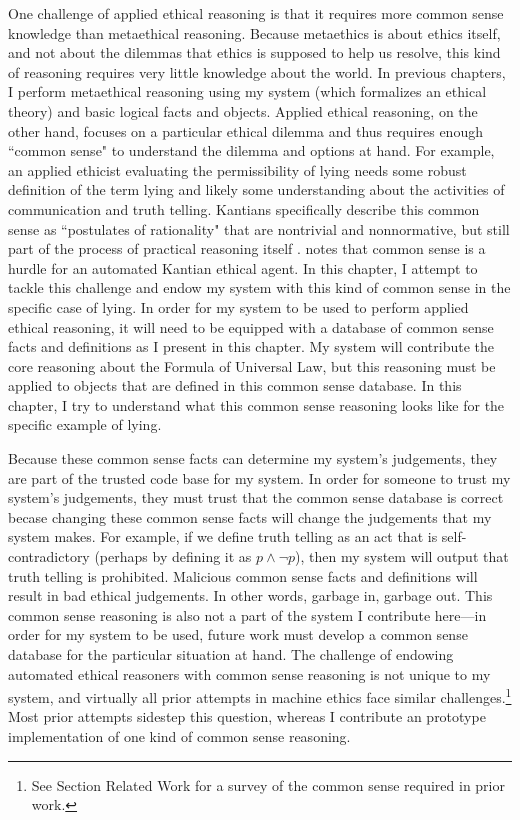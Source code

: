 \begin{isabellebody}
\begin{isamarkuptext}
One challenge of applied ethical reasoning is that it requires more common sense knowledge than metaethical
reasoning. Because metaethics is about ethics itself, and not about the dilemmas that ethics is 
supposed to help us resolve, this kind of reasoning requires very little knowledge about the world. 
In previous chapters, I perform metaethical reasoning using my system (which formalizes an 
ethical theory) and basic logical facts and objects. Applied ethical reasoning, on the other hand,
focuses on a particular ethical dilemma and thus requires enough 
``common sense" to understand the dilemma and options at hand. For example, an applied ethicist 
evaluating the permissibility of lying needs some robust definition of the term lying and likely some
understanding about the activities of communication and truth telling. Kantians specifically describe
this common sense as ``postulates of rationality" that are nontrivial and nonnormative, but still
part of the process of practical reasoning itself \citep{silber}. \citet{powers} notes that common sense 
is a hurdle for an automated Kantian ethical agent. In this chapter, I attempt to tackle this challenge and
endow my system with this kind of common sense in the specific case of lying. In order for my 
system to be used to perform applied ethical reasoning, it will need to be equipped with a database
of common sense facts and definitions as I present in this chapter. My system will contribute the core
reasoning about the Formula of Universal Law, but this reasoning must be applied to objects that are defined
in this common sense database. In this chapter, I try to understand what this common sense reasoning looks like
for the specific example of lying. 

Because these common sense facts can determine my system's judgements, they are part of the trusted
code base for my system. In order for someone to trust my system's judgements, they must trust that the
common sense database is correct becase changing these common sense facts will change the judgements 
that my system makes. For example, if we define truth telling as an act that is self-contradictory (perhaps
by defining it as $p \wedge \neg p$), then my system will output that truth telling is prohibited.
Malicious common sense facts and definitions will result in bad ethical judgements. In other words, garbage in, 
garbage out. This common sense reasoning is also not a part of the system I contribute here—in order for my
system to be used, future work must develop a common sense database for the particular situation at hand. 
The challenge of endowing automated ethical reasoners with common sense reasoning is not unique to my 
system, and virtually all prior attempts in machine ethics face similar challenges.\footnote{See Section
Related Work for a survey of the common sense required in prior work.} Most prior attempts
sidestep this question, whereas I contribute an prototype implementation of one kind of common sense reasoning.


\end{isamarkuptext}
\end{isabellebody}
